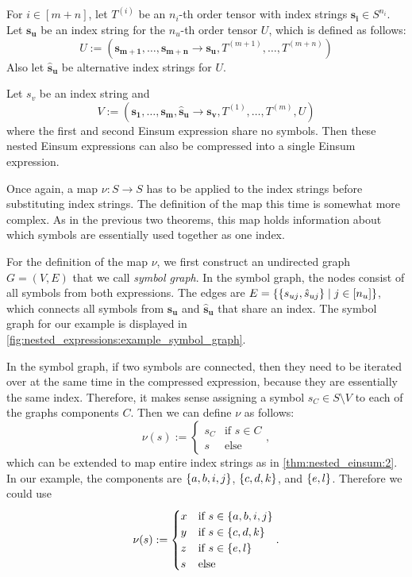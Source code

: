 \begin{theorem}
    \label{thm:nested_einsum:4}
    For $i \in [m + n]$, let $T^{(i)}$ be an $n_i$-th order tensor with index strings $\bm{s_i} \in S^{n_i}$.
    Let $\bm{s_u}$ be an index string for the $n_u$-th order tensor $U$, which is defined as follows:
    $$U := (\bm{s_{m + 1}},\dots,\bm{s_{m + n}} \rightarrow \bm{s_u}, T^{(m + 1)},\dots,T^{(m + n)})$$
    Also let $\bm{\hat{s}_u}$ be alternative index strings for $U$.

    Let $s_v$ be an index string and
    $$V := (\bm{s_1},\dots,\bm{s_m}, \bm{\hat{s}_u} \rightarrow \bm{s_v}, T^{(1)},\dots,T^{(m)}, U)$$
    where the first and second Einsum expression share no symbols.
    Then these nested Einsum expressions can also be compressed into a single Einsum expression.

    Once again, a map $\nu: S \rightarrow S$ has to be applied to the index strings before substituting index strings.
    The definition of the map this time is somewhat more complex.
    As in the previous two theorems, this map holds information about which symbols are essentially used together as one index.

    For the definition of the map $\nu$, we first construct an undirected graph $G = (V, E)$ that we call \textit{symbol graph}.
    In the symbol graph, the nodes consist of all symbols from both expressions.
    The edges are $E = \lbrace \lbrace s_{uj}, \hat{s}_{uj} \rbrace \mid j \in [n_u] \rbrace$,
    which connects all symbols from $\bm{s_u}$ and $\bm{\hat{s}_u}$ that share an index.
    The symbol graph for our example is displayed in \autoref{fig:nested_expressions:example_symbol_graph}.

    In the symbol graph, if two symbols are connected, then they need to be iterated over at the same time in the compressed expression, because they are essentially the same index.
    Therefore, it makes sense assigning a symbol $s_C \in S \setminus V$ to each of the graphs components $C$.
    Then we can define $\nu$ as follows:
    $$\nu(s) := \begin{cases}
            s_C & \text{if } s \in C \\
            s   & \text{else}
        \end{cases},$$
    which can be extended to map entire index strings as in \autoref{thm:nested_einsum:2}.
    In our example, the components are $\lbrace a,b,i,j \rbrace$, $\lbrace c,d,k \rbrace$, and $\lbrace e,l \rbrace$.
    Therefore we could use
    $$\nu(s) := \begin{cases}
            x & \text{if } s \in \lbrace a,b,i,j \rbrace \\
            y & \text{if } s \in \lbrace c,d,k \rbrace   \\
            z & \text{if } s \in \lbrace e,l \rbrace     \\
            s & \text{else}
        \end{cases}.$$


\end{theorem}
